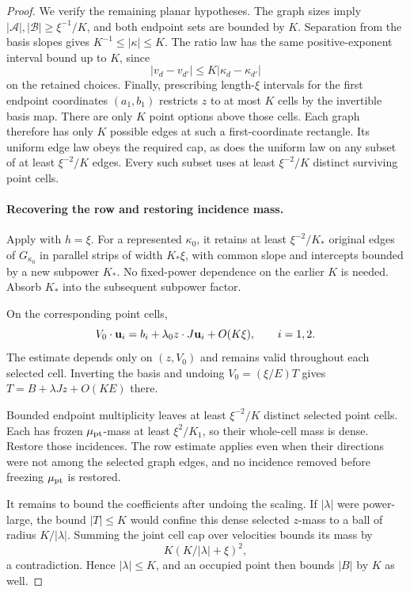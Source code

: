 \begin{proof}
We verify the remaining planar hypotheses.  The graph sizes imply
\(|\mathcal A|,|\mathcal B|\ge\xi^{-1}/K\), and both endpoint
sets are bounded by \(K\).  Separation from the basis slopes
gives \(K^{-1}\le|\kappa|\le K\).  The ratio law has the
same positive-exponent interval bound up to \(K\), since
\[
 |v_d-v_{d'}|\le K|\kappa_d-\kappa_{d'}|
\]
on the retained choices.  Finally, prescribing length-\(\xi\)
intervals for the first endpoint coordinates \((a_1,b_1)\)
restricts \(z\) to at most \(K\) cells by the invertible
basis map.  There are only \(K\) point options above those
cells.  Each graph therefore has only \(K\) possible edges
at such a first-coordinate rectangle.  Its uniform edge law
obeys the required cap, as does the uniform law on any subset
of at least \(\xi^{-2}/K\) edges.  Every such subset uses
at least \(\xi^{-2}/K\) distinct surviving point cells.

\paragraph{Recovering the row and restoring incidence mass.}
Apply  with \(h=\xi\).
For a represented \(\kappa_0\), it retains at least
\(\xi^{-2}/K_*\) original edges of \(G_{\kappa_0}\) in
parallel strips of width \(K_*\xi\), with common slope and
intercepts bounded by a new subpower \(K_*\).  No fixed-power
dependence on the earlier \(K\) is needed.  Absorb \(K_*\)
into the subsequent subpower factor.

On the corresponding point cells,
\[
 V_0\cdot{\bf u}_i
   =b_i+\lambda_0z\cdot J{\bf u}_i+O(K\xi),\qquad i=1,2.
\]
The estimate depends only on \((z,V_0)\) and remains valid
throughout each selected cell.  Inverting the basis and undoing
\(V_0=(\xi/E)T\) gives
\(T=B+\lambda Jz+O(KE)\) there.

Bounded endpoint multiplicity leaves at least \(\xi^{-2}/K\)
distinct selected point cells.  Each has frozen
\(\mu_{\rm pt}\)-mass at least \(\xi^2/K_1\), so their
whole-cell mass is dense.  Restore those incidences.  The row
estimate applies even when their directions were not among the
selected graph edges, and no incidence removed before freezing
\(\mu_{\rm pt}\) is restored.

It remains to bound the coefficients after undoing the scaling.
If \(|\lambda|\) were power-large, the bound \(|T|\le K\)
would confine this dense selected \(z\)-mass to a ball of
radius \(K/|\lambda|\).  Summing the joint cell cap over
velocities bounds its mass by
\[
 K(K/|\lambda|+\xi)^2,
\]
a contradiction.  Hence \(|\lambda|\le K\), and an occupied
point then bounds \(|B|\) by \(K\) as well.
\end{proof}

